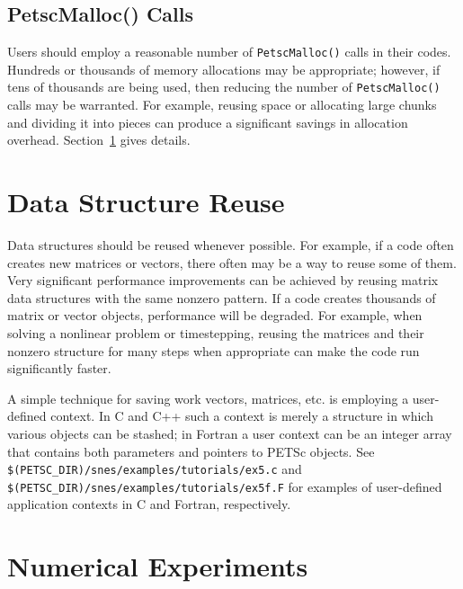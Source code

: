\subsection{PetscMalloc() Calls}
Users should employ a reasonable number of {\tt PetscMalloc()} calls in their codes.
Hundreds or thousands of memory allocations may be appropriate; however, if tens of 
thousands are being used, then reducing the number of {\tt PetscMalloc()} calls
may be warranted.  For example, reusing space or allocating large chunks 
and dividing it into pieces can produce a significant savings in 
allocation overhead.  Section~\ref{sec:dsreuse} gives details.

\section{Data Structure Reuse}
\label{sec:dsreuse}

Data structures should be reused whenever possible.  For example, if a code often
creates new matrices or vectors, there often may be a way to reuse some
of them.  Very significant performance improvements can be achieved by
reusing matrix data structures with the same nonzero pattern.  If a code
creates thousands of matrix or vector objects, performance will be
degraded.  For example, when solving a nonlinear problem or timestepping,
reusing the matrices and their nonzero structure for many steps when
 appropriate can make the code run significantly faster.  

A simple technique for saving work vectors, matrices, etc. is employing
a user-defined context.  In C and C++ such a context is merely a
structure in which various objects can be stashed; in Fortran a user
context can be an integer array that contains both parameters and pointers
to PETSc objects. See {\tt \$(PETSC\_DIR)/snes/examples/tutorials/ex5.c} and 
{\tt \$(PETSC\_DIR)/snes/examples/tutorials/ex5f.F} for examples of user-defined application
contexts in C and Fortran, respectively.

\section{Numerical Experiments}

